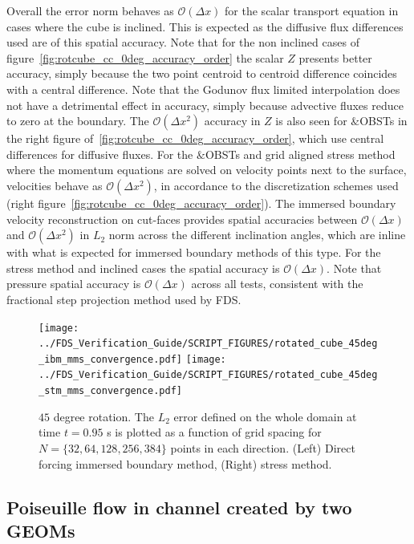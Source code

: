 \documentclass[11pt]{book}
\begin{document}
Overall the error norm behaves as $\mathcal{O}(\Delta x)$ for the scalar transport equation in cases where the cube is inclined. This is expected as the diffusive flux differences used are of this spatial accuracy. Note that for the non inclined cases of figure~\ref{fig:rotcube_cc_0deg_accuracy_order} the scalar $Z$ presents better accuracy, simply because the two point centroid to centroid difference coincides with a central difference. Note that the Godunov flux limited interpolation does not have a detrimental effect in accuracy, simply because advective fluxes reduce to zero at the boundary.
The $\mathcal{O}(\Delta x^2)$ accuracy in $Z$ is also seen for $\&$OBSTs in the right figure of~\ref{fig:rotcube_cc_0deg_accuracy_order}, which use central differences for diffusive fluxes.
For the $\&$OBSTs and grid aligned stress method where the momentum equations are solved on velocity points next to the surface, velocities behave as $\mathcal{O}(\Delta x^2)$, in accordance to the discretization schemes used (right figure~\ref{fig:rotcube_cc_0deg_accuracy_order}). The immersed boundary velocity reconstruction on cut-faces provides spatial accuracies between $\mathcal{O}(\Delta x)$ and $\mathcal{O}(\Delta x^2)$ in $L_2$ norm across the different inclination angles, which are inline with what is expected for immersed boundary methods of this type. For the stress method and inclined cases the spatial accuracy is $\mathcal{O}(\Delta x)$. Note that pressure spatial accuracy is $\mathcal{O}(\Delta x)$ across all tests, consistent with the fractional step projection method used by FDS.

\begin{figure}[ht]
\centering
\texttt{[image: ../FDS\_Verification\_Guide/SCRIPT\_FIGURES/rotated\_cube\_45deg\_ibm\_mms\_convergence.pdf]}
\texttt{[image: ../FDS\_Verification\_Guide/SCRIPT\_FIGURES/rotated\_cube\_45deg\_stm\_mms\_convergence.pdf]}
\caption[The {\ct Rotated Cube CC} accuracy order test case]{$45$ degree rotation. The $L_2$ error defined on the whole domain at time $t = 0.95$ s is plotted as a function of grid spacing for $N=\{32,64,128,256,384\}$ points in each direction. (Left) Direct forcing immersed boundary method, (Right) stress method.}\label{fig:rotcube_cc_45deg_accuracy_order}
\end{figure}



\subsection{Poiseuille flow in channel created by two GEOMs}
\end{document}
